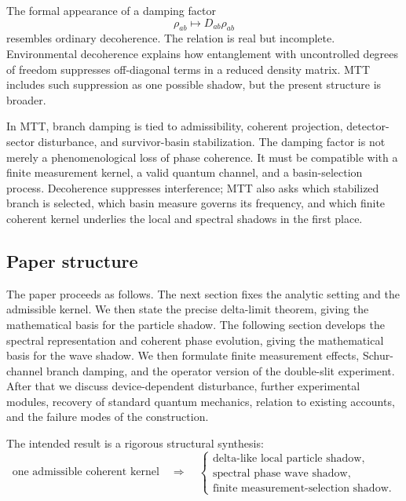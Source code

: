 \documentclass[11pt]{article}
\begin{document}
The formal appearance of a damping factor
\begin{equation}
  \rho_{ab}\mapsto D_{ab}\rho_{ab}
\end{equation}
resembles ordinary decoherence. The relation is real but incomplete. Environmental
decoherence explains how entanglement with uncontrolled degrees of freedom suppresses
off-diagonal terms in a reduced density matrix. MTT includes such suppression as one possible
shadow, but the present structure is broader.

In MTT, branch damping is tied to admissibility, coherent projection, detector-sector
disturbance, and survivor-basin stabilization. The damping factor is not merely a phenomenological
loss of phase coherence. It must be compatible with a finite measurement kernel, a valid
quantum channel, and a basin-selection process. Decoherence suppresses interference; MTT
also asks which stabilized branch is selected, which basin measure governs its frequency, and
which finite coherent kernel underlies the local and spectral shadows in the first place.

\subsection{Paper structure}
\label{subsec:paper-structure}

The paper proceeds as follows. The next section fixes the analytic setting and the admissible
kernel. We then state the precise delta-limit theorem, giving the mathematical basis for the
particle shadow. The following section develops the spectral representation and coherent
phase evolution, giving the mathematical basis for the wave shadow. We then formulate
finite measurement effects, Schur-channel branch damping, and the operator version of the
double-slit experiment. After that we discuss device-dependent disturbance, further
experimental modules, recovery of standard quantum mechanics, relation to existing accounts,
and the failure modes of the construction.

The intended result is a rigorous structural synthesis:
\begin{equation}
  \boxed{
  \text{one admissible coherent kernel}
  \quad\Longrightarrow\quad
  \begin{cases}
  \text{delta-like local particle shadow},\\
  \text{spectral phase wave shadow},\\
  \text{finite measurement-selection shadow}.
  \end{cases}
  }
  \label{eq:purpose-summary}
\end{equation}
\end{document}
